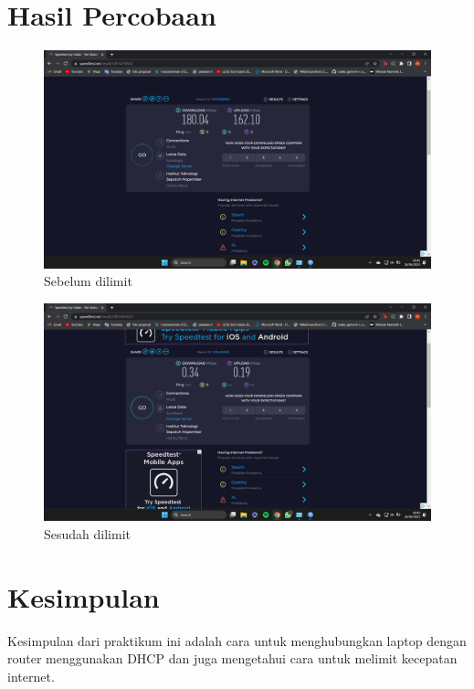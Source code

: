 \documentclass{article}
\begin{document}
    \section{Hasil Percobaan}
    \begin{figure}[h!]
        \includegraphics[width=\linewidth]{Before.png}
        \caption{Sebelum dilimit}
    \end{figure}
    \begin{figure}[h!]
        \includegraphics[width=\linewidth]{After.png}
        \caption{Sesudah dilimit}
    \end{figure}

    \newpage
    \section{Kesimpulan}
    Kesimpulan dari praktikum ini adalah cara untuk menghubungkan laptop dengan router menggunakan DHCP dan juga mengetahui cara untuk melimit kecepatan internet.
\end{document}

